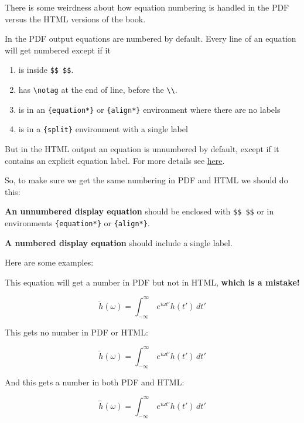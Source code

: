 \documentclass[]{book}
\providecommand{\tightlist}{%
  \setlength{\itemsep}{0pt}\setlength{\parskip}{0pt}}
\begin{document}
There is some weirdness about how equation numbering is handled in the PDF versus the HTML versions of the book.

In the PDF output equations are numbered by default. Every line of an equation will get numbered except if it

\begin{enumerate}
\def\labelenumi{\arabic{enumi}.}
\tightlist
\item
  is inside \texttt{\$\$\ \$\$}.
\item
  has \texttt{\textbackslash{}notag} at the end of line, before the \texttt{\textbackslash{}\textbackslash{}}.
\item
  is in an \texttt{\{equation*\}} or \texttt{\{align*\}} environment where there are no labels
\item
  is in a \texttt{\{split\}} environment with a single label
\end{enumerate}

But in the HTML output an equation is unnumbered by default, except if it contains an explicit equation label. For more details see \href{https://bookdown.org/yihui/bookdown/markdown-extensions-by-bookdown.html}{here}.

So, to make sure we get the same numbering in PDF and HTML we should do this:

\textbf{An unnumbered display equation} should be enclosed with \texttt{\$\$\ \$\$} or in environments \texttt{\{equation*\}} or \texttt{\{align*\}}.

\textbf{A numbered display equation} should include a single label.

Here are some examples:

This equation will get a number in PDF but not in HTML, \textbf{which is a mistake!}

\begin{equation} 
  \tilde h(\omega) = \int_{-\infty}^{\infty}\,e^{i\omega t'} h(t') \, dt'
\end{equation}

This gets no number in PDF or HTML:

\begin{equation*} 
  \tilde h(\omega) = \int_{-\infty}^{\infty}\,e^{i\omega t'} h(t') \, dt'
\end{equation*}

And this gets a number in both PDF and HTML:

\begin{equation} 
  \tilde h(\omega) = \int_{-\infty}^{\infty}\,e^{i\omega t'} h(t') \, dt'
  \label{eq:transfu}
\end{equation}
\end{document}
